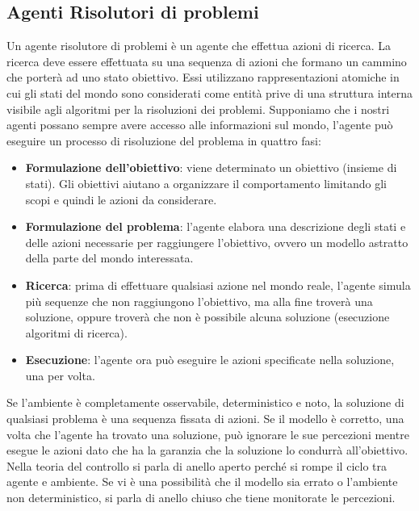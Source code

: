 \documentclass{article}
\begin{document}
\subsection{Agenti Risolutori di problemi}
Un agente risolutore di problemi è un agente che effettua azioni di ricerca. La ricerca deve essere effettuata su una sequenza di azioni che formano un cammino che porterà ad uno stato obiettivo. Essi utilizzano rappresentazioni atomiche in cui gli stati del mondo sono considerati come entità prive di una struttura interna visibile agli algoritmi per la risoluzioni dei problemi.
Supponiamo che i nostri agenti possano sempre avere accesso alle informazioni sul mondo, l'agente può eseguire un processo di risoluzione del problema in quattro fasi:
\begin{itemize}
    \item \textbf{Formulazione dell'obiettivo}: viene determinato un obiettivo (insieme di stati). Gli obiettivi aiutano a organizzare il comportamento limitando gli scopi e quindi le azioni da considerare.
    \item \textbf{Formulazione del problema}: l'agente elabora una descrizione degli stati e delle azioni necessarie per raggiungere l'obiettivo, ovvero un modello astratto della parte del mondo interessata.
    \item \textbf{Ricerca}: prima di effettuare qualsiasi azione nel mondo reale, l'agente simula più sequenze che non raggiungono l'obiettivo, ma alla fine troverà una soluzione, oppure troverà che non è possibile alcuna soluzione (esecuzione algoritmi di ricerca).
    \item \textbf{Esecuzione}: l'agente ora può eseguire le azioni specificate nella soluzione, una per volta.
\end{itemize}
Se l'ambiente è completamente osservabile, deterministico e noto, la soluzione di qualsiasi problema è una sequenza fissata di azioni. Se il modello è corretto, una volta che l'agente ha trovato una soluzione, può ignorare le sue percezioni mentre esegue le azioni dato che ha la garanzia che la soluzione lo condurrà all'obiettivo. 
Nella teoria del controllo si parla di anello aperto perché si rompe il ciclo tra agente e ambiente. Se vi è una possibilità che il modello sia errato o l'ambiente non deterministico, si parla di anello chiuso che tiene monitorate le percezioni.
\newpage
\end{document}
